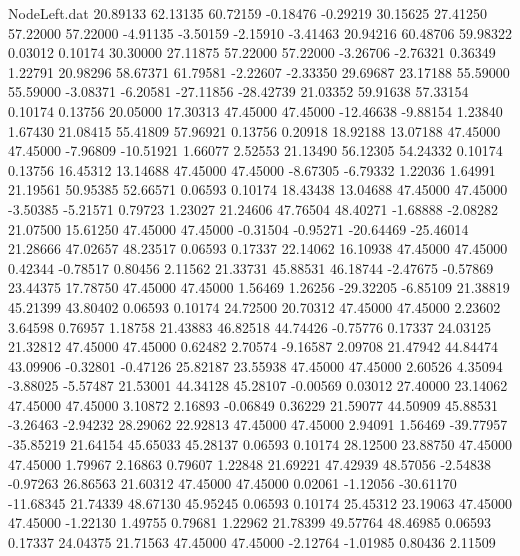 \begin{filecontents}{NodeLeft.dat}
  20.89133   62.13135   60.72159    -0.18476   -0.29219   30.15625   27.41250   57.22000   57.22000   -4.91135   -3.50159   -2.15910   -3.41463
  20.94216   60.48706   59.98322     0.03012    0.10174   30.30000   27.11875   57.22000   57.22000   -3.26706   -2.76321    0.36349    1.22791
  20.98296   58.67371   61.79581    -2.22607   -2.33350   29.69687   23.17188   55.59000   55.59000   -3.08371   -6.20581  -27.11856  -28.42739
  21.03352   59.91638   57.33154     0.10174    0.13756   20.05000   17.30313   47.45000   47.45000  -12.46638   -9.88154    1.23840    1.67430
  21.08415   55.41809   57.96921     0.13756    0.20918   18.92188   13.07188   47.45000   47.45000   -7.96809  -10.51921    1.66077    2.52553
  21.13490   56.12305   54.24332     0.10174    0.13756   16.45312   13.14688   47.45000   47.45000   -8.67305   -6.79332    1.22036    1.64991
  21.19561   50.95385   52.66571     0.06593    0.10174   18.43438   13.04688   47.45000   47.45000   -3.50385   -5.21571    0.79723    1.23027
  21.24606   47.76504   48.40271    -1.68888   -2.08282   21.07500   15.61250   47.45000   47.45000   -0.31504   -0.95271  -20.64469  -25.46014
  21.28666   47.02657   48.23517     0.06593    0.17337   22.14062   16.10938   47.45000   47.45000    0.42344   -0.78517    0.80456    2.11562
  21.33731   45.88531   46.18744    -2.47675   -0.57869   23.44375   17.78750   47.45000   47.45000    1.56469    1.26256  -29.32205   -6.85109
  21.38819   45.21399   43.80402     0.06593    0.10174   24.72500   20.70312   47.45000   47.45000    2.23602    3.64598    0.76957    1.18758
  21.43883   46.82518   44.74426    -0.75776    0.17337   24.03125   21.32812   47.45000   47.45000    0.62482    2.70574   -9.16587    2.09708
  21.47942   44.84474   43.09906    -0.32801   -0.47126   25.82187   23.55938   47.45000   47.45000    2.60526    4.35094   -3.88025   -5.57487
  21.53001   44.34128   45.28107    -0.00569    0.03012   27.40000   23.14062   47.45000   47.45000    3.10872    2.16893   -0.06849    0.36229
  21.59077   44.50909   45.88531    -3.26463   -2.94232   28.29062   22.92813   47.45000   47.45000    2.94091    1.56469  -39.77957  -35.85219
  21.64154   45.65033   45.28137     0.06593    0.10174   28.12500   23.88750   47.45000   47.45000    1.79967    2.16863    0.79607    1.22848
  21.69221   47.42939   48.57056    -2.54838   -0.97263   26.86563   21.60312   47.45000   47.45000    0.02061   -1.12056  -30.61170  -11.68345
  21.74339   48.67130   45.95245     0.06593    0.10174   25.45312   23.19063   47.45000   47.45000   -1.22130    1.49755    0.79681    1.22962
  21.78399   49.57764   48.46985     0.06593    0.17337   24.04375   21.71563   47.45000   47.45000   -2.12764   -1.01985    0.80436    2.11509

\end{filecontents}

